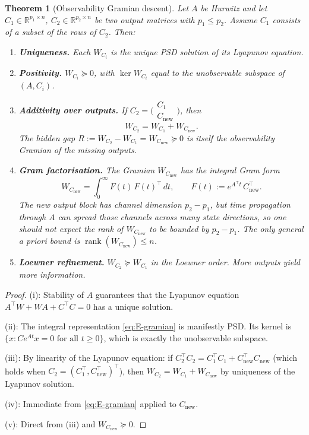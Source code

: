 \documentclass[11pt,a4paper]{article}
\numberwithin{equation}{section}
\DeclareMathOperator{\rank}{rank}
\newcommand{\R}{\mathbb{R}}
\theoremstyle{thmcompact}
\newtheorem{theorem}{Theorem}[section]
\theoremstyle{remark}
\begin{document}
\begin{theorem}[Observability Gramian descent]\label{thm:bridge-E}
Let $A$ be Hurwitz and let $C_1 \in \R^{p_1 \times n}$, $C_2 \in \R^{p_2 \times n}$ be two output matrices with $p_1 \leq p_2$. Assume $C_1$ consists of a subset of the rows of $C_2$. Then:
\begin{enumerate}[label=\textup{(\roman*)}]
\item \textbf{Uniqueness.} Each $W_{C_i}$ is the unique PSD solution of its Lyapunov equation.
\item \textbf{Positivity.} $W_{C_i} \succeq 0$, with $\ker W_{C_i}$ equal to the unobservable subspace of $(A, C_i)$.
\item \textbf{Additivity over outputs.} If $C_2 = \bigl(\begin{smallmatrix} C_1 \\ C_{\mathrm{new}} \end{smallmatrix}\bigr)$, then
\begin{equation}\label{eq:E-additive}
W_{C_2} = W_{C_1} + W_{C_{\mathrm{new}}}.
\end{equation}
The hidden gap $R := W_{C_2} - W_{C_1} = W_{C_{\mathrm{new}}} \succeq 0$ is itself the observability Gramian of the missing outputs.
\item \textbf{Gram factorisation.} The Gramian $W_{C_{\mathrm{new}}}$ has the integral Gram form
\begin{equation}\label{eq:E-gram}
W_{C_{\mathrm{new}}} = \int_0^\infty F(t)\,F(t)^\top\,dt, \qquad F(t) := e^{A^\top t}\,C_{\mathrm{new}}^\top.
\end{equation}
The new output block has channel dimension $p_2 - p_1$, but time propagation through $A$ can spread those channels across many state directions, so one should not expect the rank of $W_{C_{\mathrm{new}}}$ to be bounded by $p_2 - p_1$. The only general a priori bound is $\rank(W_{C_{\mathrm{new}}}) \le n$.
\item \textbf{Loewner refinement.} $W_{C_2} \succeq W_{C_1}$ in the Loewner order. More outputs yield more information.
\end{enumerate}
\end{theorem}

\begin{proof}
(i): Stability of $A$ guarantees that the Lyapunov equation $A^\top W + WA + C^\top C = 0$ has a unique solution.

(ii): The integral representation \eqref{eq:E-gramian} is manifestly PSD. Its kernel is $\{x : Ce^{At}x = 0 \text{ for all } t \geq 0\}$, which is exactly the unobservable subspace.

(iii): By linearity of the Lyapunov equation: if $C_2^\top C_2 = C_1^\top C_1 + C_{\mathrm{new}}^\top C_{\mathrm{new}}$ (which holds when $C_2 = (C_1^\top, C_{\mathrm{new}}^\top)^\top$), then $W_{C_2} = W_{C_1} + W_{C_{\mathrm{new}}}$ by uniqueness of the Lyapunov solution.

(iv): Immediate from \eqref{eq:E-gramian} applied to $C_{\mathrm{new}}$.

(v): Direct from (iii) and $W_{C_{\mathrm{new}}} \succeq 0$.
\end{proof}
\end{document}
